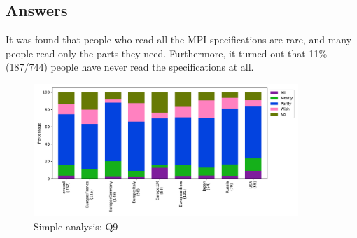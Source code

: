 
\subsection{Answers}


It was found that people who read all the MPI specifications are rare, 
and many people read only the parts they need. Furthermore, it turned 
out that 11\% (187/744) people have never read the specifications at all.

\begin{figure}[htb]
\begin{center}
\includegraphics[width=10cm]{../pdfs/Q9.pdf}
\caption{Simple analysis: Q9}
\label{fig:Q9}
\end{center}
\end{figure}
